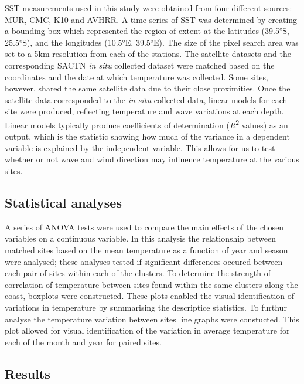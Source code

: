 \documentclass[12pt,a4paper,]{article}
\begin{document}
SST measurements used in this study were obtained from four different
sources: MUR, CMC, K10 and AVHRR. A time series of SST was determined by
creating a bounding box which represented the region of extent at the
latitudes (39.5°S, 25.5°S), and the longitudes (10.5°E, 39.5°E). The
size of the pixel search area was set to a 5km resolution from each of
the stations. The satellite datasets and the corresponding SACTN
\emph{in situ} collected dataset were matched based on the coordinates
and the date at which temperature was collected. Some sites, however,
shared the same satellite data due to their close proximities. Once the
satellite data corresponded to the \emph{in situ} collected data, linear
models for each site were produced, reflecting temperature and wave
variations at each depth. Linear models typically produce coefficients
of determination (\emph{R}\textsuperscript{2} values) as an output,
which is the statistic showing how much of the variance in a dependent
variable is explained by the independent variable. This allows for us to
test whether or not wave and wind direction may influence temperature at
the various sites.

\hypertarget{statistical-analyses}{%
\subsection{Statistical analyses}\label{statistical-analyses}}

A series of ANOVA tests were used to compare the main effects of the
chosen variables on a continuous variable. In this analysis the
relationship between matched sites based on the mean temperature as a
function of year and season were analysed; these analyses tested if
significant differences occured between each pair of sites within each
of the clusters. To determine the strength of correlation of temperature
between sites found within the same clusters along the coast, boxplots
were constructed. These plots enabled the visual identification of
variations in temperature by summarising the descriptice statistics. To
furthur analyse the temperature variation between sites line graphs were
constucted. This plot allowed for visual identification of the variation
in average temperature for each of the month and year for paired sites.

\hypertarget{results}{%
\subsection{Results}\label{results}}
\end{document}
